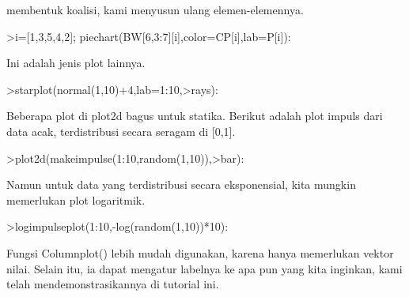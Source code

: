 \documentclass{article}
\begin{document}
\begin{eulernotebook}
\begin{eulercomment}
\begin{eulercomment}
\begin{eulercomment}
membentuk koalisi, kami menyusun ulang elemen-elemennya.
\end{eulercomment}
\begin{eulerprompt}
>i=[1,3,5,4,2]; piechart(BW[6,3:7][i],color=CP[i],lab=P[i]):
\end{eulerprompt}
\begin{eulercomment}
Ini adalah jenis plot lainnya.
\end{eulercomment}
\begin{eulerprompt}
>starplot(normal(1,10)+4,lab=1:10,>rays):
\end{eulerprompt}
\begin{eulercomment}
Beberapa plot di plot2d bagus untuk statika. Berikut adalah plot
impuls dari data acak, terdistribusi secara seragam di [0,1].
\end{eulercomment}
\begin{eulerprompt}
>plot2d(makeimpulse(1:10,random(1,10)),>bar):
\end{eulerprompt}
\begin{eulercomment}
Namun untuk data yang terdistribusi secara eksponensial, kita mungkin
memerlukan plot logaritmik.
\end{eulercomment}
\begin{eulerprompt}
>logimpulseplot(1:10,-log(random(1,10))*10):
\end{eulerprompt}
\begin{eulercomment}
Fungsi Columnplot() lebih mudah digunakan, karena hanya memerlukan
vektor nilai. Selain itu, ia dapat mengatur labelnya ke apa pun yang
kita inginkan, kami telah mendemonstrasikannya di tutorial ini.


\end{eulercomment}
\end{eulercomment}
\end{eulercomment}
\end{eulernotebook}
\end{document}

